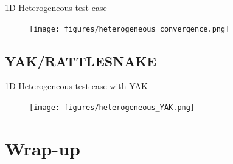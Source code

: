 \documentclass[8pt]{beamer}
\begin{document}
\begin{frame}{1D Heterogeneous test case}

\begin{figure}[h]
\texttt{[image: figures/heterogeneous\_convergence.png]}
\label{fig:IQS}
\end{figure}

\end{frame}



\subsection{YAK/RATTLESNAKE}

\begin{frame}{1D Heterogeneous test case with YAK}

\begin{figure}[h]
\texttt{[image: figures/heterogeneous\_YAK.png]}
\label{fig:IQS}
\end{figure}

\end{frame}


%
%


%


\section{Wrap-up}
\end{document}
